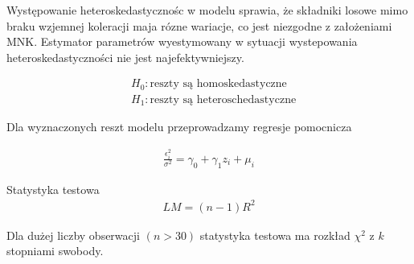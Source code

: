 Występowanie heteroskedastycznośc w modelu sprawia, że składniki losowe mimo braku wzjemnej koleracji maja rózne wariacje, co jest niezgodne z założeniami MNK.
Estymator parametrów wyestymowany w sytuacji wystepowania heteroskedastyczności nie jest najefektywniejszy.


\begin{equation}
    \begin{split}
        &H_0: \text{reszty są homoskedastyczne}\\
        &H_1: \text{reszty są heteroschedastyczne}
    \end{split}
\end{equation}

Dla wyznaczonych reszt modelu przeprowadzamy regresje pomocnicza

\begin{equation}
    \begin{split}
        \frac{\epsilon_{i}^{2}}{\sigma^2} = \gamma_{0} + \gamma_{1}z_{i} + \mu_{i}
    \end{split}
\end{equation}

Statystyka testowa
\begin{equation}
    \begin{split}
        LM = (n-1)R^{2}
    \end{split}
\end{equation}

Dla dużej liczby obserwacji \((n > 30)\) statystyka testowa ma rozkład \(\chi^{2}\) z \(k\) stopniami swobody.